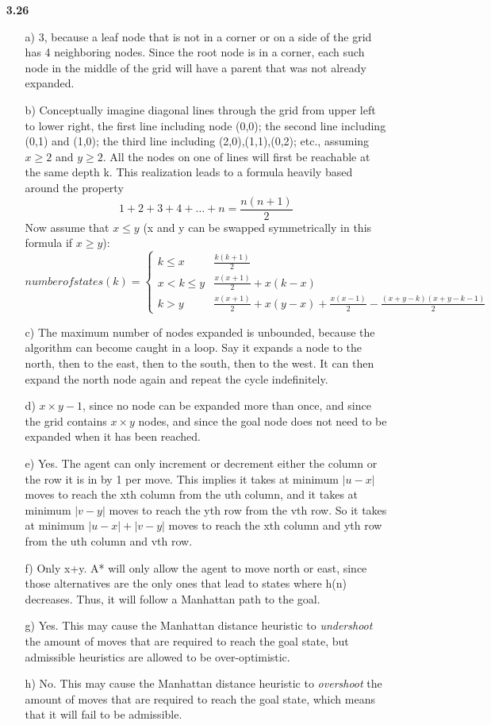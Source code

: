 \documentclass{article}
\begin{document}
\begin{enumerate}
\item[\textbf{3.26}]
\begin{enumerate}
\item[a)]
3, because a leaf node that is not in a corner or on a side of the grid has 4 neighboring nodes. Since the root
node is in a corner, each such node in the middle of the grid will have a parent that was not already expanded.
\item[b)]
Conceptually imagine diagonal lines through the grid from upper left to lower right, the first line including
node (0,0); the second line including (0,1) and (1,0); the third line including (2,0),(1,1),(0,2); etc., assuming
$x \ge 2$ and $y \ge 2$. All the nodes on one of lines will first be reachable at the same depth k. This realization
leads to a formula heavily based around the property 
\[
1+2+3+4+ \ldots +n = \frac{n(n+1)}{2}
\]
Now assume that $x \le y$ (x and y can be swapped symmetrically in this formula if $x \ge y$):
\[
number of states(k)=
\begin{cases}
k \le x & \frac{k(k+1)}{2}\\
x < k \le y & \frac{x(x+1)}{2} + x(k-x)\\
k > y & \frac{x(x+1)}{2} + x(y-x) + \frac{x(x-1)}{2} - \frac{(x+y-k)(x+y-k-1)}{2}
\end{cases}
\]
\item[c)]
The maximum number of nodes expanded is unbounded, because the algorithm can become caught in a loop. Say it expands
a node to the north, then to the east, then to the south, then to the west. It can then expand the north node again
and repeat the cycle indefinitely.
\item[d)]
$x \times y - 1$, since no node can be expanded more than once, and since the grid contains $x \times y$ nodes, and
since the goal node does not need to be expanded when it has been reached.
\item[e)]
Yes. The agent can only increment or decrement either the column or the row it is in by 1 per move.
This implies it takes at minimum $|u-x|$ moves to reach the xth column from the uth column, and it takes at minimum
$|v-y|$ moves to reach the yth row from the vth row. So it takes at minimum $|u-x| + |v-y|$ moves to reach the xth
column and yth row from the uth column and vth row.
\item[f)]
Only x+y. A* will only allow the agent to move north or east, since those alternatives are the only ones that lead
to states where h(n) decreases. Thus, it will follow a Manhattan path to the goal.
\item[g)]
Yes. This may cause the Manhattan distance heuristic to \emph{undershoot} the amount of moves that are required to
reach the goal state, but admissible heuristics are allowed to be over-optimistic.
\item[h)]
No. This may cause the Manhattan distance heuristic to \emph{overshoot} the amount of moves that are required to
reach the goal state, which means that it will fail to be admissible.
\end{enumerate}


\end{enumerate}
\end{document}
